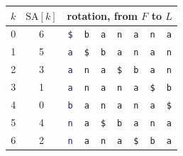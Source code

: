 \begin{tabular}{c|c|c@{\,}c@{\,}c@{\,}c@{\,}c@{\,}c@{\,}c}
$k$ & $\mathrm{SA}[k]$ & \multicolumn{7}{c}{rotation, from $F$ to $L$}\\ \hline
0 & 6 & \textcolor{MidnightBlue}{\texttt{\$}} & \texttt{b} & \texttt{a} & \texttt{n} & \texttt{a} & \texttt{n} & \textcolor{BrickRed}{\texttt{a}}\\
1 & 5 & \textcolor{MidnightBlue}{\texttt{a}} & \texttt{\$} & \texttt{b} & \texttt{a} & \texttt{n} & \texttt{a} & \textcolor{BrickRed}{\texttt{n}}\\
2 & 3 & \textcolor{MidnightBlue}{\texttt{a}} & \texttt{n} & \texttt{a} & \texttt{\$} & \texttt{b} & \texttt{a} & \textcolor{BrickRed}{\texttt{n}}\\
3 & 1 & \textcolor{MidnightBlue}{\texttt{a}} & \texttt{n} & \texttt{a} & \texttt{n} & \texttt{a} & \texttt{\$} & \textcolor{BrickRed}{\texttt{b}}\\
4 & 0 & \textcolor{MidnightBlue}{\texttt{b}} & \texttt{a} & \texttt{n} & \texttt{a} & \texttt{n} & \texttt{a} & \textcolor{BrickRed}{\texttt{\$}}\\
5 & 4 & \textcolor{MidnightBlue}{\texttt{n}} & \texttt{a} & \texttt{\$} & \texttt{b} & \texttt{a} & \texttt{n} & \textcolor{BrickRed}{\texttt{a}}\\
6 & 2 & \textcolor{MidnightBlue}{\texttt{n}} & \texttt{a} & \texttt{n} & \texttt{a} & \texttt{\$} & \texttt{b} & \textcolor{BrickRed}{\texttt{a}}\\
\end{tabular}
